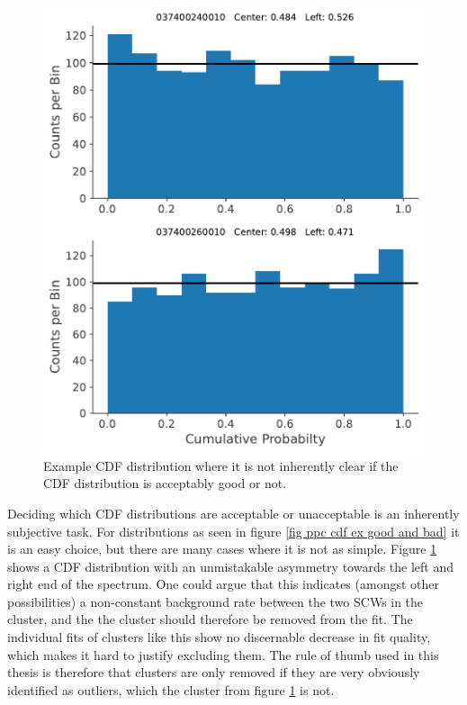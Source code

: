 \documentclass{report}
\begin{document}
\FloatBarrier

\begin{figure}
  \vspace{-00pt}
  \includegraphics[width=\linewidth]{Images/PPC_and_Background_Analysis/037400240010_037400260010_cdf.pdf}
  \vspace{-00pt}
  \caption{Example CDF distribution where it is not inherently clear if the CDF distribution is acceptably good or not.}
  \vspace{-150pt}
  \label{fig ppc mediocre}
\end{figure}

Deciding which CDF distributions are acceptable or unacceptable is an inherently subjective task. For distributions as seen in figure \ref{fig ppc cdf ex good and bad} it is an easy choice, but there are many cases where it is not as simple. Figure \ref{fig ppc mediocre} shows a CDF distribution with an unmistakable asymmetry towards the left and right end of the spectrum. One could argue that this indicates (amongst other possibilities) a non-constant background rate between the two SCWs in the cluster, and the the cluster should therefore be removed from the fit. The individual fits of clusters like this show no discernable decrease in fit quality, which makes it hard to justify excluding them. The rule of thumb used in this thesis is therefore that clusters are only removed if they are very obviously identified as outliers, which the cluster from figure \ref{fig ppc mediocre} is not.
\end{document}
